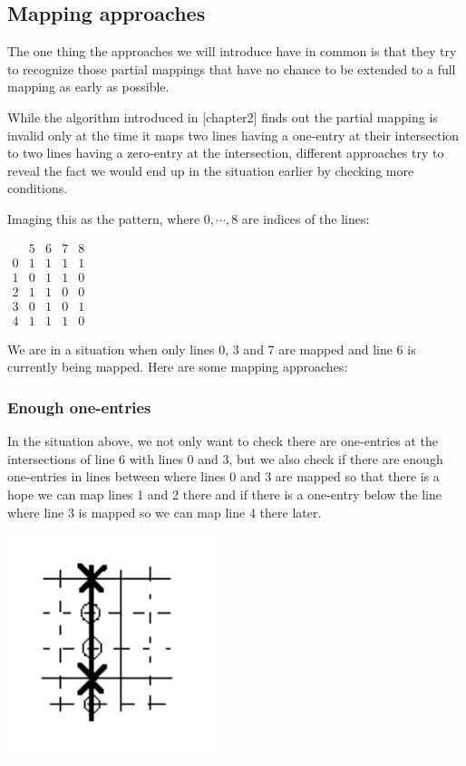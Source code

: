 \subsection{Mapping approaches}
The one thing the approaches we will introduce have in common is that they try to recognize those partial mappings that have no chance to be extended to a full mapping as early as possible.

While the algorithm introduced in [chapter2] finds out the partial mapping is invalid only at the time it maps two lines having a one-entry at their intersection to two lines having a zero-entry at the intersection, different approaches try to reveal the fact we would end up in the situation earlier by checking more conditions.

Imaging this as the pattern, where $0,\cdots,8$ are indices of the lines:

\centerline{\mbox{$\begin{array}{c|cccc}
&5&6&7&8 \\
\hline
0&1&1&1&1 \\
1&0&1&1&0 \\
2&1&1&0&0 \\
3&0&1&0&1 \\
4&1&1&1&0
\end{array}$}}

We are in a situation when only lines 0, 3 and 7 are mapped and line 6 is currently being mapped. Here are some mapping approaches:
\subsubsection{Enough one-entries}
In the situation above, we not only want to check there are one-entries at the intersections of line 6 with lines 0 and 3, but we also check if there are enough one-entries in lines between where lines 0 and 3 are mapped so that there is a hope we can map lines 1 and 2 there and if there is a one-entry below the line where line 3 is mapped so we can map line 4 there later.

\centerline{\mbox{\includegraphics[width=60mm]{../img/enough_one-entries.png}}}
